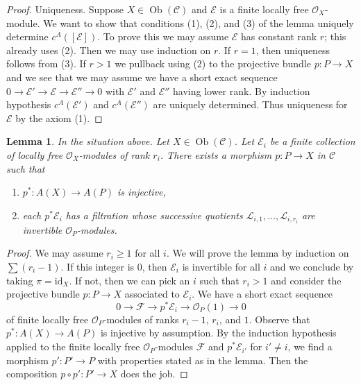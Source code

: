 \documentclass{stacks-project}
\theoremstyle{plain}
\newtheorem{lemma}[subsection]{Lemma}
\theoremstyle{definition}
\theoremstyle{remark}
\numberwithin{equation}{subsection}
\def\Ob{\mathop{\mathrm{Ob}}\nolimits}
\begin{document}
\begin{proof}
\medskip\noindent
Uniqueness. Suppose $X \in \Ob(\mathcal{C})$ and $\mathcal{E}$
is a finite locally free $\mathcal{O}_X$-module. We want to show
that conditions (1), (2), and (3) of the lemma uniquely determine
$c^A([\mathcal{E}])$. To prove this we may assume $\mathcal{E}$
has constant rank $r$; this already uses (2). Then we may use induction on $r$.
If $r = 1$, then uniqueness follows from (3).
If $r > 1$ we pullback using (2) to the projective bundle $p : P \to X$
and we see that we may assume we have a short exact sequence
$0 \to \mathcal{E}' \to \mathcal{E} \to \mathcal{E}'' \to 0$
with $\mathcal{E}'$ and $\mathcal{E}''$ having lower rank.
By induction hypothesis $c^A(\mathcal{E}')$ and $c^A(\mathcal{E}'')$
are uniquely determined. Thus uniqueness for $\mathcal{E}$ by
the axiom (1).
\end{proof}

\begin{lemma}
\label{lemma-splitting-principle}
In the situation above. Let $X \in \Ob(\mathcal{C})$. Let $\mathcal{E}_i$
be a finite collection of locally free $\mathcal{O}_X$-modules of rank $r_i$.
There exists a morphism $p : P \to X$ in $\mathcal{C}$ such that
\begin{enumerate}
\item $p^* : A(X) \to A(P)$ is injective,
\item each $p^*\mathcal{E}_i$ has a filtration whose successive quotients
$\mathcal{L}_{i, 1}, \ldots, \mathcal{L}_{i, r_i}$
are invertible $\mathcal{O}_P$-modules.
\end{enumerate}
\end{lemma}

\begin{proof}
We may assume $r_i \geq 1$ for all $i$. We will prove the lemma by induction
on $\sum (r_i - 1)$. If this integer is $0$, then $\mathcal{E}_i$
is invertible for all $i$ and we conclude by taking $\pi = \text{id}_X$.
If not, then we can pick an $i$ such that $r_i > 1$ and consider the
projective bundle $p : P \to X$ associated to $\mathcal{E}_i$.
We have a short exact sequence
$$
0 \to \mathcal{F} \to p^*\mathcal{E}_i \to \mathcal{O}_P(1) \to 0
$$
of finite locally free $\mathcal{O}_P$-modules of ranks $r_i - 1$,
$r_i$, and $1$. Observe that $p^* : A(X) \to A(P)$ is injective
by assumption. By the induction hypothesis applied to the finite locally free
$\mathcal{O}_P$-modules $\mathcal{F}$ and $p^*\mathcal{E}_{i'}$
for $i' \not = i$, we find a morphism $p' : P' \to P$ with
properties stated as in the lemma. Then the composition
$p \circ p' : P' \to X$ does the job.
\end{proof}
\end{document}
